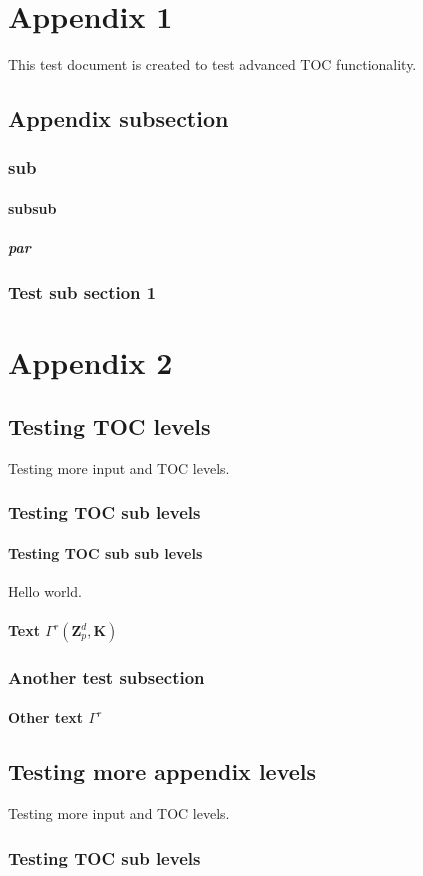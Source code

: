 \chapter{Appendix 1}
This test document is created to test advanced TOC functionality.

\section{Appendix subsection}

\subsection{sub}

\subsubsection{subsub}

\paragraph{par}

\subsection{Test sub section 1}

\chapter{Appendix 2}
\label{chap: appendix 2}

\section{Testing TOC levels}
Testing more input and TOC levels.

\subsection{Testing TOC sub levels}

\subsubsection{Testing TOC sub sub levels}
Hello world.

\subsubsection{Text $\Gamma^{r}(\ensuremath{{\mathbf{Z}}}_p^d,\mathbf{K})$}

\subsection{Another test subsection}

\subsubsection{Other text $\Gamma^{r}$}

\section{Testing more appendix levels}
Testing more input and TOC levels.

\subsection{Testing TOC sub levels}

